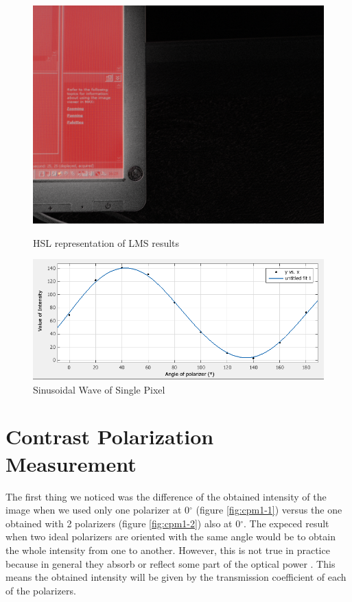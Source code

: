 \documentclass{article}
\begin{document}
\begin{figure}[H]
\centering
\begin{minipage}[b]{0.45\linewidth}
\includegraphics[width=1.0\textwidth,natwidth=100,natheight=100]{../LMS/results/result_lms.png}
\caption{HSL representation of LMS results}
\label{fig:hslms}
\end{minipage}
\quad
\begin{minipage}[b]{0.45\linewidth}
\includegraphics[width=1.2\textwidth,natwidth=100,natheight=100]{../LMS/results/sinus_wave.png}
\caption{Sinusoidal Wave of Single Pixel}
\label{fig:sin}
\end{minipage}
\end{figure}   
\section{Contrast Polarization Measurement}

The first thing we noticed was the difference of the obtained intensity of the image
when we used only one polarizer at 0$^\circ$ (figure \ref{fig:cpm1-1}) 
versus the one obtained with 2 polarizers
(figure \ref{fig:cpm1-2}) also at 0$^\circ$. The expeced result when two ideal 
polarizers are oriented with the same angle would be to obtain the whole
intensity from one to another. However, this is not true in practice because
in general they absorb or reflect some part of the optical power \cite{idealvsreal}.
This means the obtained intensity will be given by the transmission coefficient
of each of the polarizers.
\end{document}

